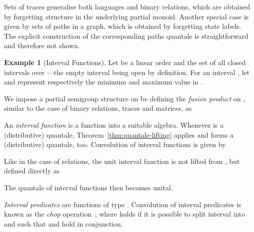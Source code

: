 \documentclass[12pt]{article}
\theoremstyle{definition}
\newtheorem{example}{Example}
\begin{document}
Sets of traces generalise both languages and binary relations, which
are obtained by forgetting structure in the underlying partial
monoid. Another special case is given by sets of paths in a graph,
which is obtained by forgetting state labels. The explicit
construction of the corresponding paths quantale is straightforward
and therefore not shown.

\begin{example}[Interval Functions]\label{ex:interval-functions}
  Let  be a linear order and  the set of all closed
  intervals over ---the empty interval being open by definition.
  For an interval , let  and  represent 
  respectively the minimum and maximum value in .

  We impose a partial semigroup structure on  be defining the
  \emph{fusion product} on , similar to the case of binary
  relations, traces and matrices, as

An \emph{interval function} is a function  into a suitable
algebra. Whenever  is a (distributive) quantale,
Theorem~\ref{thm:quantale-lifting} applies and  forms a
(distributive) quantale, too. Convolution of interval functions is
given by

Like in the case of relations, the unit interval function is not
lifted from , but defined directly as

The quantale of interval functions then becomes unital.

\emph{Interval predicates} are functions of type . Convolution of interval predicates is known as the
\emph{chop} operation~\cite{Mos00}, where  holds if
it is possible to split interval  into  and 
such that  and  hold in conjunction.
\begin{center}
\end{center}


\end{example}
\end{document}
